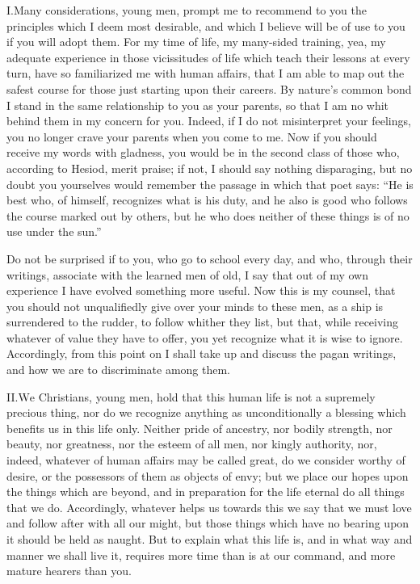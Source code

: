 \documentclass[a4paper]{article}
\begin{document}
\newpage

\lettrine[lines=3, findent=3pt, nindent=0pt]{I.} Many considerations, young men, prompt me to recommend to you the principles which I deem most desirable, and which I believe will be of use to you if you will adopt them. For my time of life, my many-sided training, yea, my adequate experience in those vicissitudes of life which teach their lessons at every turn, have so familiarized me with human affairs, that I am able to map out the safest course for those just starting upon their careers. By nature's common bond I stand in the same relationship to you as your parents, so that I am no whit behind them in my concern for you. Indeed, if I do not misinterpret your feelings, you no longer crave your parents when you come to me. Now if you should receive my words with gladness, you would be in the second class of those who, according to Hesiod, merit praise; if not, I should say nothing disparaging, but no doubt you yourselves would remember the passage in which that poet says: ``He is best who, of himself, recognizes what is his duty, and he also is good who follows the course marked out by others, but he who does neither of these things is of no use under the sun.''

Do not be surprised if to you, who go to school every day, and who, through their writings, associate with the learned men of old, I say that out of my own experience I have evolved something more useful. Now this is my counsel, that you should not unqualifiedly give over your minds to these men, as a ship is surrendered to the rudder, to follow whither they list, but that, while receiving whatever of value they have to offer, you yet recognize what it is wise to ignore. Accordingly, from this point on I shall take up and discuss the pagan writings, and how we are to discriminate among them.

\bigskip

\lettrine[lines=3, findent=3pt, nindent=0pt]{II.} We Christians, young men, hold that this human life is not a supremely precious thing, nor do we recognize anything as unconditionally a blessing which benefits us in this life only. Neither pride of ancestry, nor bodily strength, nor beauty, nor greatness, nor the esteem of all men, nor kingly authority, nor, indeed, whatever of human affairs may be called great, do we consider worthy of desire, or the possessors of them as objects of envy; but we place our hopes upon the things which are beyond, and in preparation for the life eternal do all things that we do. Accordingly, whatever helps us towards this we say that we must love and follow after with all our might, but those things which have no bearing upon it should be held as naught. But to explain what this life is, and in what way and manner we shall live it, requires more time than is at our command, and more mature hearers than you.
\end{document}

